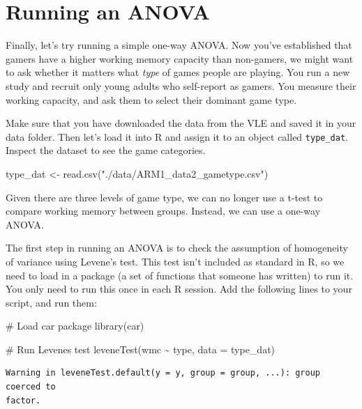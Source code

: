\documentclass[
  a4paper,
  DIV=11,
  numbers=noendperiod]{scrreprt}
\newenvironment{Shaded}{\begin{snugshade}}{\end{snugshade}}
\newcommand{\AttributeTok}[1]{\textcolor[rgb]{0.40,0.45,0.13}{#1}}
\newcommand{\CommentTok}[1]{\textcolor[rgb]{0.37,0.37,0.37}{#1}}
\newcommand{\FunctionTok}[1]{\textcolor[rgb]{0.28,0.35,0.67}{#1}}
\newcommand{\NormalTok}[1]{\textcolor[rgb]{0.00,0.23,0.31}{#1}}
\newcommand{\OtherTok}[1]{\textcolor[rgb]{0.00,0.23,0.31}{#1}}
\newcommand{\SpecialCharTok}[1]{\textcolor[rgb]{0.37,0.37,0.37}{#1}}
\newcommand{\StringTok}[1]{\textcolor[rgb]{0.13,0.47,0.30}{#1}}
\begin{document}
\section{Running an ANOVA}\label{running-an-anova}

Finally, let's try running a simple one-way ANOVA. Now you've
established that gamers have a higher working memory capacity than
non-gamers, we might want to ask whether it matters what \emph{type} of
games people are playing. You run a new study and recruit only young
adults who self-report as gamers. You measure their working capacity,
and ask them to select their dominant game type.

Make sure that you have downloaded the data from the VLE and saved it in
your data folder. Then let's load it into R and assign it to an object
called \texttt{type\_dat}. Inspect the dataset to see the game
categories.

\begin{Shaded}
\begin{Highlighting}[]
\NormalTok{type\_dat }\OtherTok{\textless{}{-}} \FunctionTok{read.csv}\NormalTok{(}\StringTok{"./data/ARM1\_data2\_gametype.csv"}\NormalTok{)}
\end{Highlighting}
\end{Shaded}

Given there are three levels of game type, we can no longer use a t-test
to compare working memory between groups. Instead, we can use a one-way
ANOVA.

The first step in running an ANOVA is to check the assumption of
homogeneity of variance using Levene's test. This test isn't included as
standard in R, so we need to load in a package (a set of functions that
someone has written) to run it. You only need to run this once in each R
session. Add the following lines to your script, and run them:

\begin{Shaded}
\begin{Highlighting}[]
\CommentTok{\# Load car package}
\FunctionTok{library}\NormalTok{(car)}

\CommentTok{\# Run Levene\textquotesingle{}s test}
\FunctionTok{leveneTest}\NormalTok{(wmc }\SpecialCharTok{\textasciitilde{}}\NormalTok{ type, }\AttributeTok{data =}\NormalTok{ type\_dat)}
\end{Highlighting}
\end{Shaded}

\begin{verbatim}
Warning in leveneTest.default(y = y, group = group, ...): group coerced to
factor.
\end{verbatim}
\end{document}
